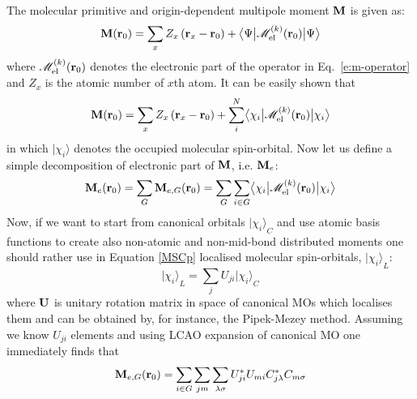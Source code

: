 \documentclass[a4paper,titlepage,twoside,fleqn,12pt]{book}
\newcommand{\ket}[1]{\ensuremath{\bigr\rvert {#1} \bigr\rangle}}
\newcommand{\tbraket}[3]{\ensuremath{\bigl\langle {#1} \bigl\lvert {#2} \bigl\lvert {#3} \bigr\rangle}}
\begin{document}
\begin{appendices}
\begin{refsection}
The molecular primitive and origin\hyp{}dependent multipole moment $\bf M$
is given as:
%
\begin{equation}\label{M}
{\bf M} ({\bf r}_0) = \sum_x Z_x\left({\bf r}_x - {\bf r}_0 \right)  
                    + \tbraket{\Psi}{\mathscr{M}^{(k)}_{\rm el}({\bf r}_0) }{\Psi}
\end{equation}
%
%
%
where $\mathscr{M}^{(k)}_{\rm el}({\bf r}_0)$ denotes the electronic
part of the operator in Eq.~\eqref{e:m-operator} and
$Z_x$ is the atomic number of $x$th atom.
It can be easily shown that
%
\begin{equation}\label{MSC}
{\bf M}({\bf r}_0) = \sum_x Z_x\left({\bf r}_x - {\bf r}_0 \right) 
                   + \sum_i^N \tbraket{\chi_i}{\mathscr{M}^{(k)}_{\rm el}({\bf r}_0)}{\chi_i}
\end{equation}
%
in which $\ket{\chi_i}$ denotes the occupied molecular spin\hyp{}orbital.
Now let us define a simple decomposition of electronic part of $\bf M$, i.e. ${\bf M}_e$:
%
\begin{equation}\label{MSCp}
{\bf M}_e({\bf r}_0) = \sum_G {\bf M}_{e,G}({\bf r}_0) 
                     = \sum_G \sum_{i \in G} \tbraket{\chi_i}{\mathscr{M}^{(k)}_{\rm el}({\bf r}_0)}{\chi_i}
\end{equation}
%
Now, if we want to start from canonical orbitals $\ket{\chi_i}_C$ and use atomic basis functions to create also
non\hyp{}atomic and non\hyp{}mid\hyp{}bond distributed moments one should rather use in Equation \eqref{MSCp} localised
molecular spin\hyp{}orbitals, $\ket{\chi_i}_L$:
%
\begin{equation}\label{a}
\ket{\chi_i}_L = \sum_j U_{ji} \ket{\chi_i}_C
\end{equation}
%
where $\bf U$ is unitary rotation matrix in space of canonical MOs which localises them
and can be obtained by, for instance, the Pipek\hyp{}Mezey method. \citep{Pipek.Mezey.JCP.1989}
Assuming we know
$U_{ji}$ elements and using LCAO expansion of canonical MO one immediately finds that
%
\begin{equation}\label{b}
{\bf M}_{e,G}({\bf r}_0) = \sum_{i \in G} \sum_{jm} \sum_{\lambda\sigma} U^*_{ji} U_{mi} C^*_{j\lambda} C_{m\sigma}

\end{equation}
\end{refsection}
\end{appendices}
\end{document}
